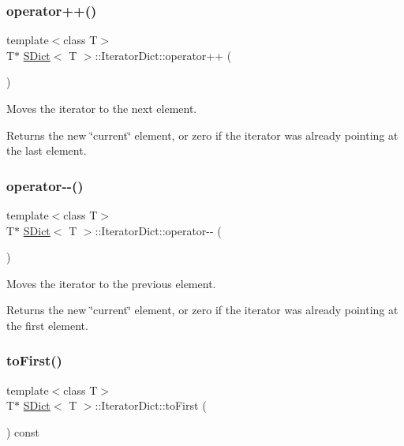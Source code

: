 \subsubsection{\texorpdfstring{operator++()}{operator++()}}
{\footnotesize\ttfamily template$<$class T$>$ \\
T$\ast$ \mbox{\hyperlink{class_s_dict}{S\+Dict}}$<$ T $>$\+::Iterator\+Dict\+::operator++ (\begin{DoxyParamCaption}{ }\end{DoxyParamCaption})\hspace{0.3cm}{\ttfamily [inline]}}

Moves the iterator to the next element. \begin{DoxyReturn}{Returns}
the new \char`\"{}current\char`\"{} element, or zero if the iterator was already pointing at the last element. 
\end{DoxyReturn}
\mbox{\label{class_s_dict_1_1_iterator_dict_a842928fda118cdd32174fa614e4adfc7}} 
\subsubsection{\texorpdfstring{operator-\/-\/()}{operator--()}}
{\footnotesize\ttfamily template$<$class T$>$ \\
T$\ast$ \mbox{\hyperlink{class_s_dict}{S\+Dict}}$<$ T $>$\+::Iterator\+Dict\+::operator-\/-\/ (\begin{DoxyParamCaption}{ }\end{DoxyParamCaption})\hspace{0.3cm}{\ttfamily [inline]}}

Moves the iterator to the previous element. \begin{DoxyReturn}{Returns}
the new \char`\"{}current\char`\"{} element, or zero if the iterator was already pointing at the first element. 
\end{DoxyReturn}
\mbox{\label{class_s_dict_1_1_iterator_dict_abb90d1056963746a20c592b8c998846c}} 
\subsubsection{\texorpdfstring{toFirst()}{toFirst()}}
{\footnotesize\ttfamily template$<$class T$>$ \\
T$\ast$ \mbox{\hyperlink{class_s_dict}{S\+Dict}}$<$ T $>$\+::Iterator\+Dict\+::to\+First (\begin{DoxyParamCaption}{ }\end{DoxyParamCaption}) const\hspace{0.3cm}{\ttfamily [inline]}}


